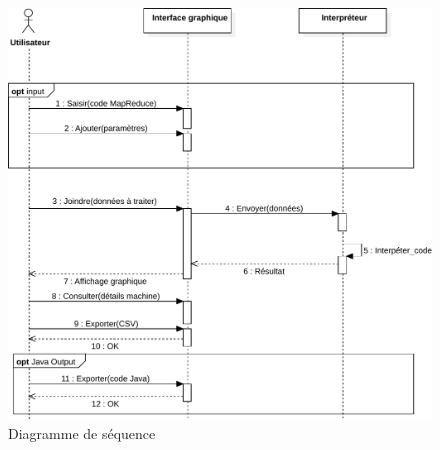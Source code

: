  \begin{figure}[H]
  \centering
    \includegraphics[width=1\textwidth]{diagram/SequenceDiagram.pdf}
        \caption{Diagramme de séquence}
        \label{fig:seq}
\end{figure}
